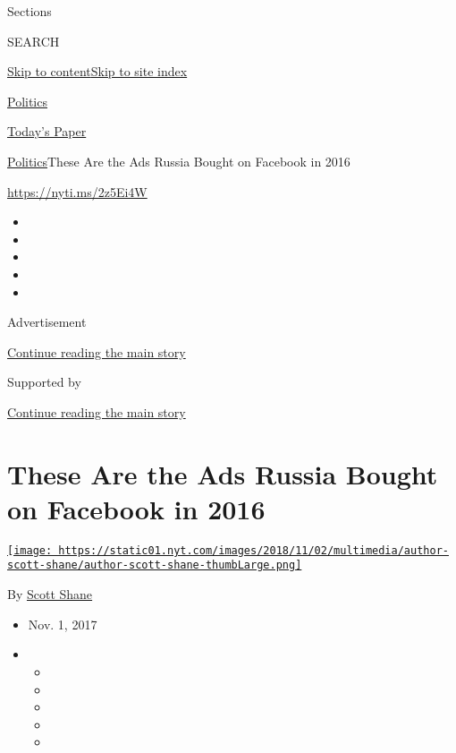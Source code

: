 Sections

SEARCH

\protect\hyperlink{site-content}{Skip to
content}\protect\hyperlink{site-index}{Skip to site index}

\href{https://www.nytimes.com/section/politics}{Politics}

\href{https://myaccount.nytimes.com/auth/login?response_type=cookie\&client_id=vi}{}

\href{https://www.nytimes.com/section/todayspaper}{Today's Paper}

\href{/section/politics}{Politics}\textbar{}These Are the Ads Russia
Bought on Facebook in 2016

\href{https://nyti.ms/2z5Ei4W}{https://nyti.ms/2z5Ei4W}

\begin{itemize}
\item
\item
\item
\item
\item
\end{itemize}

Advertisement

\protect\hyperlink{after-top}{Continue reading the main story}

Supported by

\protect\hyperlink{after-sponsor}{Continue reading the main story}

\hypertarget{these-are-the-ads-russia-bought-on-facebook-in-2016}{%
\section{These Are the Ads Russia Bought on Facebook in
2016}\label{these-are-the-ads-russia-bought-on-facebook-in-2016}}

\href{https://www.nytimes.com/by/scott-shane}{\texttt{[image: https://static01.nyt.com/images/2018/11/02/multimedia/author-scott-shane/author-scott-shane-thumbLarge.png]}}

By \href{https://www.nytimes.com/by/scott-shane}{Scott Shane}

\begin{itemize}
\item
  Nov. 1, 2017
\item
  \begin{itemize}
  \item
  \item
  \item
  \item
  \item
  \end{itemize}
\end{itemize}

